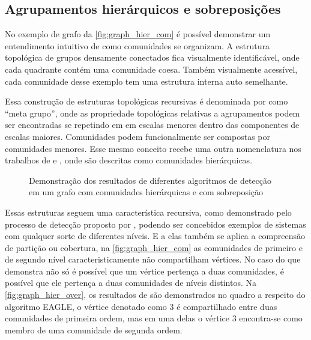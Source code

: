 \documentclass[notes.tex]{subfiles}
\begin{document}
\subsection{Agrupamentos hierárquicos e sobreposições}

No exemplo de grafo da \autoref{fig:graph_hier_com} é possível demonstrar um entendimento intuitivo de como comunidades se organizam.
A estrutura topológica de grupos densamente conectados fica visualmente identificável, onde cada quadrante contém uma comunidade coesa.
Também visualmente acessível, cada comunidade desse exemplo tem uma estrutura interna auto semelhante.

Essa construção de estruturas topológicas recursivas é denominada por  como ``meta grupo'', onde as propriedade topológicas relativas a agrupamentos podem ser encontradas se repetindo em em escalas menores dentro das componentes de escalas maiores.
Comunidades podem funcionalmente ser compostas por comunidades menores.
Esse mesmo conceito recebe uma outra nomenclatura nos trabalhos de  e , onde são descritas como comunidades hierárquicas.

\begin{figure}[htpb]
    \centering
    \caption{Demonstração dos resultados de diferentes algoritmos de detecção em um grafo com comunidades hierárquicas e com sobreposição}\label{fig:graph_hier_over}
\end{figure}

Essas estruturas seguem uma característica recursiva, como demonstrado pelo processo de detecção proposto por , podendo ser concebidos exemplos de sistemas com qualquer sorte de diferentes níveis.
E a elas também se aplica a compreensão de partição ou cobertura, na \autoref{fig:graph_hier_com} as comunidades de primeiro e de segundo nível caracteristicamente não compartilham vértices.
No caso do que demonstra  não só é possível que um vértice pertença a duas comunidades, é possível que ele pertença a duas comunidades de níveis distintos.
Na \autoref{fig:graph_hier_over}, os resultados de  são demonstrados no quadro a respeito do algoritmo EAGLE, o vértice denotado como 3 é compartilhado entre duas comunidades de primeira ordem, mas em uma delas o vértice 3 encontra-se como membro de uma comunidade de segunda ordem.
\end{document}
